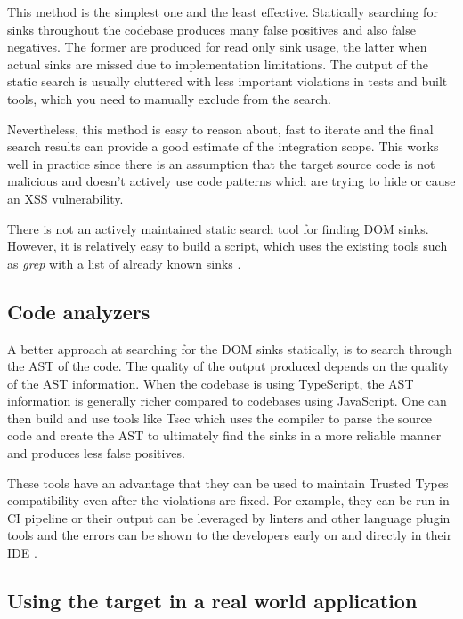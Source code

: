 This method is the simplest one and the least effective. Statically searching for sinks throughout
the codebase produces many false positives and also false negatives. The former are produced for
read only sink usage, the latter when actual sinks are missed due to implementation limitations. The
output of the static search is usually cluttered with less important violations in tests and built
tools, which you need to manually exclude from the search.

Nevertheless, this method is easy to reason about, fast to iterate and the final search results can
provide a good estimate of the integration scope. This works well in practice since there is an
assumption that the target source code is not malicious and doesn't actively use code patterns which
are trying to hide or cause an XSS vulnerability.

There is not an actively maintained static search tool for finding DOM sinks. However, it is
relatively easy to build a script, which uses the existing tools such as \emph{grep} with a list
of already known sinks \cite{xss_sink_finder}.

\subsection{Code analyzers}

A better approach at searching for the DOM sinks statically, is to search through the AST of the
code. The quality of the output produced depends on the quality of the AST information. When the
codebase is using TypeScript, the AST information is generally richer compared to codebases using
JavaScript. One can then build and use tools like Tsec \cite{tsec_github} which uses the compiler to
parse the source code and create the AST to ultimately find the sinks in a more reliable manner and
produces less false positives.

These tools have an advantage that they can be used to maintain Trusted Types compatibility even
after the violations are fixed. For example, they can be run in CI pipeline or their output can be
leveraged by linters and other language plugin tools and the errors can be shown to the developers
early on and directly in their IDE \cite{tsec_lsp}.

\subsection{Using the target in a real world application}

